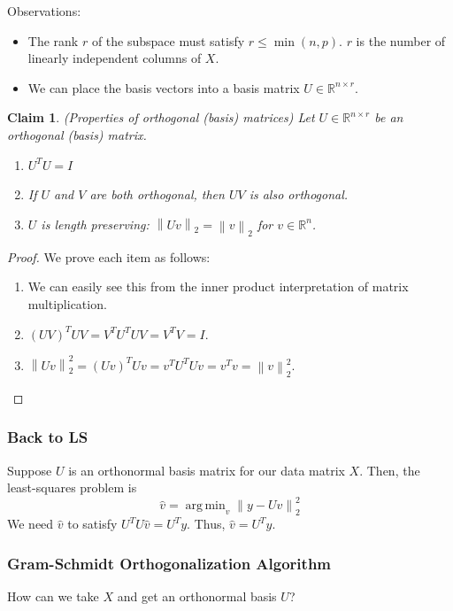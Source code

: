 \documentclass[12pt]{article}
\newtheorem{claim}{Claim}
\theoremstyle{definition}
\DeclareMathOperator*{\argmin}{arg\,min}
\newcommand{\R}{\mathbb{R}}
\newcommand{\norm}[1]{\left\lVert#1\right\rVert}
\begin{document}
Observations:
\begin{itemize}
	\item The rank $r$ of the subspace must satisfy $r \leq \min{(n,p)}$. $r$ is the number of linearly independent columns of $X$. 
	\item We can place the basis vectors into a basis matrix $U \in \R^{n \times r}$. 
\end{itemize}

\begin{claim}(Properties of orthogonal (basis) matrices)
Let $U \in \R^{n \times r}$ be an orthogonal (basis) matrix.   
\begin{enumerate}
	\item $U^T U = I$
	\item If $U$ and $V$ are both orthogonal, then $UV$ is also orthogonal.
	\item $U$ is length preserving: $\norm{Uv}_2 = \norm{v}_2$ for $v \in \R^n$.
\end{enumerate}
\end{claim}
\begin{proof}
We prove each item as follows:
\begin{enumerate}
	\item We can easily see this from the inner product interpretation of matrix multiplication.
	\item $(UV)^T UV = V^T U^T U V = V^T V = I$. 
	\item $\norm{Uv}^2_2 = (Uv)^T Uv = v^T U^T U v = v^T v = \norm{v}^2_2$.
\end{enumerate}
\end{proof}

\subsubsection{Back to LS}

Suppose $U$ is an orthonormal basis matrix for our data matrix $X$. Then, the least-squares problem is 
\begin{equation}
	\hat v = \argmin_v \norm{y - Uv}^2_2
\end{equation}
We need $\hat v$ to satisfy $U^T U \hat v = U^T y$. Thus, $\hat v = U^T y$. 

\subsubsection{Gram-Schmidt Orthogonalization Algorithm}

How can we take $X$ and get an orthonormal basis $U$?
\end{document}
